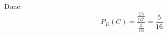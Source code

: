 \begin{correction}
\begin{enumerate}
\begin{enumerate}
Donc $$P_D(C) = \frac{\frac{15}{16^2}}{\frac{3}{16}}= \frac{5}{16}$$

\end{enumerate}
\end{enumerate}
\end{correction}